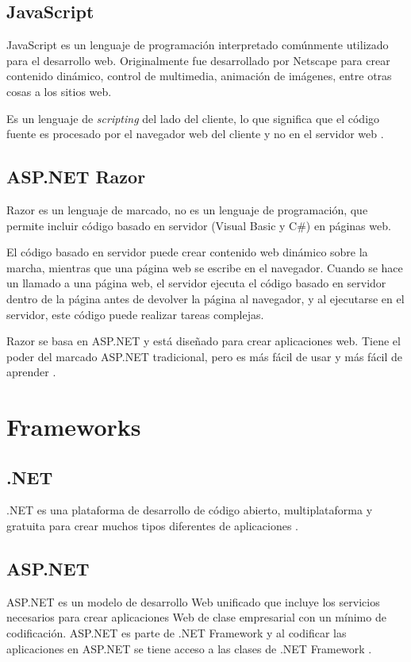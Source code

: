 \subsection{JavaScript}
JavaScript es un lenguaje de programación  interpretado comúnmente utilizado para el desarrollo web. Originalmente fue desarrollado por Netscape para crear contenido dinámico, control de multimedia, animación de imágenes, entre otras cosas a los sitios web.

Es un lenguaje de \textit{scripting} del lado del cliente, lo que significa que el código fuente es procesado por el navegador web del cliente y no en el servidor web \cite{javaScriptChristensson}.

\subsection{ASP.NET Razor}
Razor es un lenguaje de marcado, no es un lenguaje de programación, que permite incluir código basado en servidor (Visual Basic y C\#) en páginas web. 

El código basado en servidor puede crear contenido web dinámico sobre la marcha, mientras que una página web se escribe en el navegador. Cuando se hace un llamado a una página web, el servidor ejecuta el código basado en servidor dentro de la página antes de devolver la página al navegador, y al ejecutarse en el servidor, este código puede realizar tareas complejas.
 
Razor se basa en ASP.NET y está diseñado para crear aplicaciones web. Tiene el poder del marcado ASP.NET tradicional, pero es más fácil de usar y más fácil de aprender \cite{aspRazorW3school}.


\section{Frameworks}
\subsection{.NET}
.NET es una plataforma de desarrollo de código abierto, multiplataforma y gratuita para crear muchos tipos diferentes de aplicaciones \cite{netMicrosoft}.

\subsection{ASP.NET}
ASP.NET es un modelo de desarrollo Web unificado que incluye los servicios necesarios para crear aplicaciones Web de clase empresarial con un mínimo de codificación. ASP.NET es parte de .NET Framework y al codificar las aplicaciones en ASP.NET se tiene acceso a las clases de .NET Framework \cite{aspMicrosoft}.


